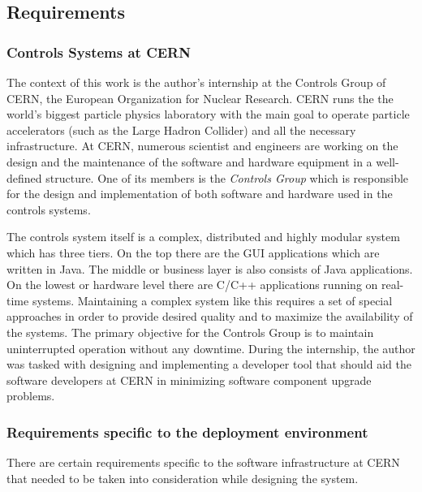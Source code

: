 \subsection{Requirements}

\subsubsection{Controls Systems at CERN}
The context of this work is the author's internship at the Controls Group of
CERN, the European Organization for Nuclear Research. CERN runs the the world's
biggest particle physics laboratory with the main goal to operate particle
accelerators (such as the Large Hadron Collider) and all the necessary
infrastructure. At CERN, numerous scientist and engineers are working on the
design and the maintenance of the software and hardware equipment in a
well-defined structure. One of its members is the \emph{Controls Group} which is
responsible for the design and implementation of both software and hardware used
in the controls systems.

The controls system itself is a complex, distributed and highly modular system
which has three tiers. On the top there are the GUI applications which are
written in Java. The middle or business layer is also consists of Java
applications. On the lowest or hardware level there are C/C++ applications
running on real-time systems. Maintaining a complex system like this requires a
set of special approaches in order to provide desired quality and to maximize
the availability of the systems. The primary objective for the Controls Group is
to maintain uninterrupted operation without any downtime. During the internship,
the author was tasked with designing and implementing a developer tool that
should aid the software developers at CERN in minimizing software component
upgrade problems.

\subsubsection{Requirements specific to the deployment environment}
There are certain requirements specific to the software infrastructure at CERN
that needed to be taken into consideration while designing the system.

